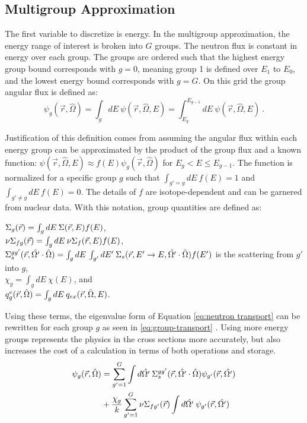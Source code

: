 \subsection{Multigroup Approximation}
The first variable to discretize is energy. In the multigroup approximation, the energy range of interest is broken into $G$ groups. The neutron flux is constant in energy over each group. The groups are ordered such that the highest energy group bound corresponds with $g = 0$, meaning group 1 is defined over $E_{1}$ to $E_{0}$, and the lowest energy bound corresponds with $g = G$. On this grid the group angular flux is defined as: 
%
\begin{equation}
  \psi_{g}(\vec{r},\hat{\Omega}) = \int_{g} dE \:\psi(\vec{r}, \hat{\Omega}, E) = \int_{E_{g}}^{E_{g-1}}dE \:\psi(\vec{r}, \hat{\Omega}, E) \:.
\end{equation}

Justification of this definition comes from assuming the angular flux within each energy group can be approximated by the product of the group flux and a known function: $\psi(\vec{r}, \hat{\Omega}, E) \approx f(E)  \psi_{g}(\vec{r},\hat{\Omega})$ for $E_{g} < E \le E_{g-1}$. The function is normalized for a specific group $g$ such that $\int_{g' = g} dE \:f(E) = 1$ and $\int_{g' \ne g} dE \:f(E) = 0$. The details of $f$ are isotope-dependent and can be garnered from nuclear data. With this notation, group quantities are defined as:

\indent $\Sigma_{g}(\vec{r}) = \int_{g} dE \:\Sigma(\vec{r}, E) f(E)$, \\
\indent $\nu \Sigma_{fg}(\vec{r}) = \int_{g} dE \:\nu \Sigma_{f}(\vec{r}, E) f(E)$, \\ 
\indent $\Sigma_s^{gg'}(\vec{r}, \hat{\Omega'} \cdot \hat{\Omega}) = \int_{g} dE \:\int_{g'} dE' \:\Sigma_{s}(\vec{r}, E' \to E, \hat{\Omega'} \cdot \hat{\Omega})  f(E')$ is the scattering from $g'$ into $g$, \\
\indent $\chi_{g} = \int_{g} dE \:\chi(E)$, and \\
\indent $q^{e}_{g}(\vec{r}, \hat{\Omega}) = \int_{g} dE \:q_{ex}(\vec{r}, \hat{\Omega}, E)$.

\noindent Using these terms, the eigenvalue form of Equation \eqref{eq:neutron transport} can be rewritten for each group $g$ as seen in \eqref{eq:group-transport} \cite{Lewis1993}. Using more energy groups represents the physics in the cross sections more accurately, but also increases the cost of a calculation in terms of both operations and storage. 
% 
\begin{align}
   [\hat{\Omega} \cdot \nabla + \Macro_{g}(\vec{r})] \psi_{g}(\vec{r}, \hat{\Omega})  &=  \sum_{g'=1}^{G} \int d\hat{\Omega'} \:\Macro_s^{gg'}(\vec{r}, \hat{\Omega'} \cdot \hat{\Omega}) \psi_{g'}(\vec{r}, \hat{\Omega'})  \nonumber \\
&+ \frac{\chi_{g}}{k}   \sum_{g'=1}^{G} \nu \Macro_{fg'}(\vec{r}) \int d\hat{\Omega'} \:\psi_{g'}(\vec{r}, \hat{\Omega'}) 
\label{eq:group-transport}
\end{align}

